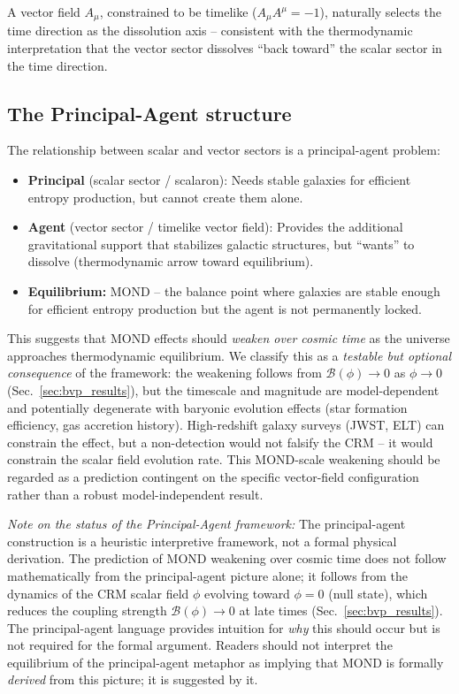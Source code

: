 \documentclass[aps,prd,twocolumn,superscriptaddress,nofootinbib]{revtex4-2}
\begin{document}
A vector field $A_\mu$, constrained to be timelike ($A_\mu A^\mu = -1$), naturally selects the time direction as the dissolution axis -- consistent with the thermodynamic interpretation that the vector sector dissolves ``back toward'' the scalar sector in the time direction.

\subsection{The Principal-Agent structure}
\label{sec:principal_agent}

The relationship between scalar and vector sectors is a principal-agent problem:
\begin{itemize}
\item \textbf{Principal} (scalar sector / scalaron): Needs stable galaxies for efficient entropy production, but cannot create them alone.
\item \textbf{Agent} (vector sector / timelike vector field): Provides the additional gravitational support that stabilizes galactic structures, but ``wants'' to dissolve (thermodynamic arrow toward equilibrium).
\item \textbf{Equilibrium:} MOND -- the balance point where galaxies are stable enough for efficient entropy production but the agent is not permanently locked.
\end{itemize}

This suggests that MOND effects should \textit{weaken over cosmic time} as the universe approaches thermodynamic equilibrium. We classify this as a \emph{testable but optional consequence} of the framework: the weakening follows from $\mathcal{B}(\phi) \to 0$ as $\phi \to 0$ (Sec.~\ref{sec:bvp_results}), but the timescale and magnitude are model-dependent and potentially degenerate with baryonic evolution effects (star formation efficiency, gas accretion history). High-redshift galaxy surveys (JWST, ELT) can constrain the effect, but a non-detection would not falsify the CRM -- it would constrain the scalar field evolution rate. This MOND-scale weakening should be regarded as a prediction contingent on the specific vector-field configuration rather than a robust model-independent result.

\textit{Note on the status of the Principal-Agent framework:} The principal-agent construction is a heuristic interpretive framework, not a formal physical derivation. The prediction of MOND weakening over cosmic time does not follow mathematically from the principal-agent picture alone; it follows from the dynamics of the CRM scalar field $\phi$ evolving toward $\phi = 0$ (null state), which reduces the coupling strength $\mathcal{B}(\phi) \to 0$ at late times (Sec.~\ref{sec:bvp_results}). The principal-agent language provides intuition for \textit{why} this should occur but is not required for the formal argument. Readers should not interpret the equilibrium of the principal-agent metaphor as implying that MOND is formally \textit{derived} from this picture; it is suggested by it.
\end{document}
